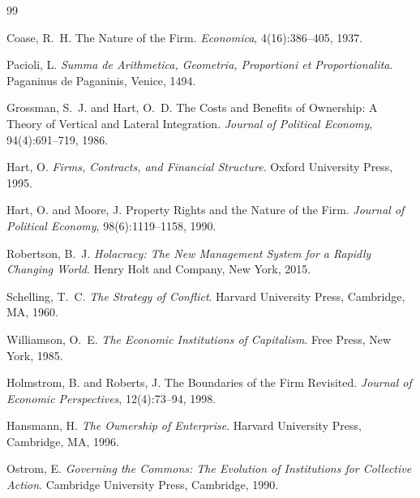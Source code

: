 \documentclass[11pt,a4paper]{article}
\theoremstyle{definition}
\theoremstyle{remark}
\begin{document}

\begin{thebibliography}{99}

Coase, R.~H.
\newblock The Nature of the Firm.
\newblock \emph{Economica}, 4(16):386--405, 1937.

Pacioli, L.
\newblock \emph{Summa de Arithmetica, Geometria, Proportioni
  et Proportionalita}.
\newblock Paganinus de Paganinis, Venice, 1494.

Grossman, S.~J. and Hart, O.~D.
\newblock The Costs and Benefits of Ownership: A Theory of Vertical
  and Lateral Integration.
\newblock \emph{Journal of Political Economy}, 94(4):691--719, 1986.

Hart, O.
\newblock \emph{Firms, Contracts, and Financial Structure}.
\newblock Oxford University Press, 1995.

Hart, O. and Moore, J.
\newblock Property Rights and the Nature of the Firm.
\newblock \emph{Journal of Political Economy}, 98(6):1119--1158, 1990.

Robertson, B.~J.
\newblock \emph{Holacracy: The New Management System for a Rapidly
  Changing World}.
\newblock Henry Holt and Company, New York, 2015.

Schelling, T.~C.
\newblock \emph{The Strategy of Conflict}.
\newblock Harvard University Press, Cambridge, MA, 1960.

Williamson, O.~E.
\newblock \emph{The Economic Institutions of Capitalism}.
\newblock Free Press, New York, 1985.

Holmstrom, B. and Roberts, J.
\newblock The Boundaries of the Firm Revisited.
\newblock \emph{Journal of Economic Perspectives}, 12(4):73--94, 1998.

Hansmann, H.
\newblock \emph{The Ownership of Enterprise}.
\newblock Harvard University Press, Cambridge, MA, 1996.

Ostrom, E.
\newblock \emph{Governing the Commons: The Evolution of Institutions
  for Collective Action}.
\newblock Cambridge University Press, Cambridge, 1990.


\end{thebibliography}
\end{document}

